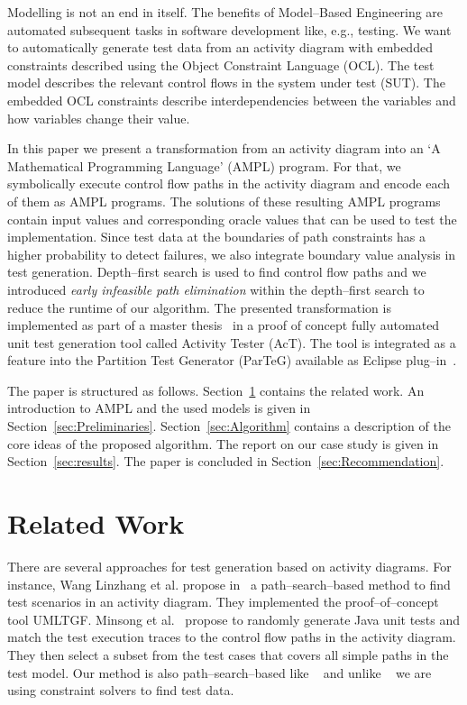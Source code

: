 \documentclass[runningheads,a4paper]{llncs}%
\begin{document}
Modelling is not an end in itself.
The benefits of Model--Based Engineering are automated subsequent tasks
in software development like, e.g., testing. We want to automatically generate test
data from an activity diagram with embedded constraints described using the Object Constraint Language (OCL). 
The test model describes the relevant control flows in the system under test
(SUT). The embedded OCL constraints describe interdependencies between the
variables and how variables change their value.

In this paper we present a transformation from an activity diagram into an `A
Mathematical Programming Language' (AMPL) program. For that, we symbolically
execute control flow paths in the activity diagram and encode each of them as
AMPL programs. The solutions of these resulting AMPL programs contain input
values and corresponding oracle values that can be used to test the
implementation. Since test data at the boundaries of path constraints has a
higher probability to detect failures, we also integrate boundary value analysis
in test generation. Depth--first search is used to find control flow paths and
we introduced \emph{early infeasible path elimination} within the depth--first
search to reduce the runtime of our algorithm. The presented transformation is
implemented as part of a master thesis~\cite{Kurth2014AutomatedGen} in a
proof of concept fully automated unit test generation tool called Activity
Tester (AcT). The tool is integrated as a feature into the Partition
Test Generator (ParTeG) available as Eclipse plug--in~\cite{PartegWebsite}.

The paper is structured as follows. Section~\ref{sec:LiteratureReview}
contains the related work. An introduction to AMPL and the used models
is given in Section~\ref{sec:Preliminaries}. 
Section~\ref{sec:Algorithm} contains a description of the core ideas of the
proposed algorithm. The report on our case study is given in
Section~\ref{sec:results}. The paper is concluded in Section~\ref{sec:Recommendation}.

\section{Related Work}%
\label{sec:LiteratureReview}%
There are several approaches for test generation based on activity diagrams.
For instance, Wang Linzhang et
al. propose in~\cite{Linzhang04GeneratingTestCasefromActivityGrayBoxMethod} a
path--search--based method to find test scenarios in an activity diagram.
They implemented the proof--of--concept tool UMLTGF. 
Minsong et al.~\cite{mingsong2006automatic} propose to randomly
generate Java unit tests and match the test execution traces to the control flow paths 
in the activity diagram. They then select a subset from the test cases that
covers all simple paths in the test model. Our method is also
path--search--based like
~\cite{Linzhang04GeneratingTestCasefromActivityGrayBoxMethod} and unlike
~\cite{mingsong2006automatic} we are using constraint solvers to find test data.
\end{document}
